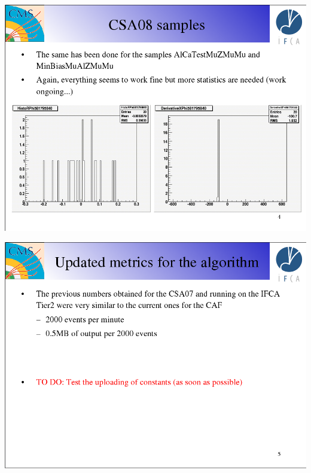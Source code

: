 \documentclass[compress]{beamer}
\begin{document}
\begin{frame}
\mbox{\hspace{-1 cm}\includegraphics[width=1.2\linewidth]{pablo3.png}}
\end{frame}

\begin{frame}
\mbox{\hspace{-1 cm}\includegraphics[width=1.2\linewidth]{pablo4.png}}
\end{frame}
\end{document}
